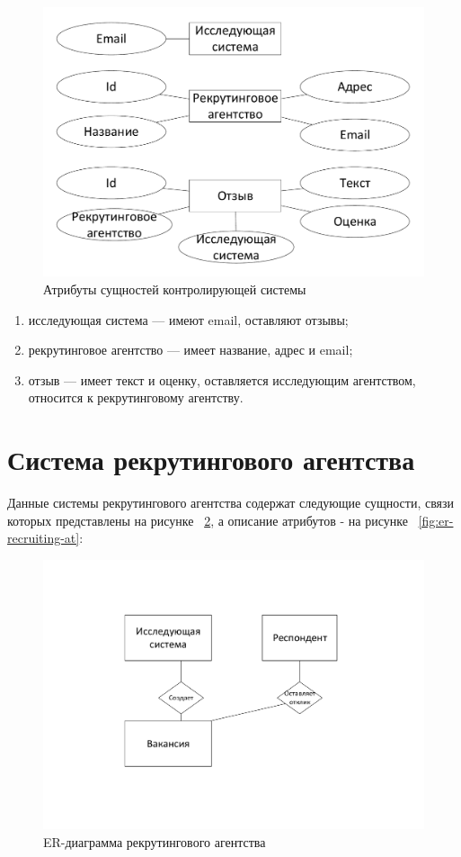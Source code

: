 \begin{figure}[ht]
  \centering
  \includegraphics[width=\textwidth]{include/er-supervising-at.pdf}
\caption{Атрибуты сущностей контролирующей системы}
\label{fig:er-supervising-at}
\end{figure}

\begin{enumerate}
\item исследующая система — имеют email, оставляют отзывы;
\item рекрутинговое агентство — имеет название, адрес и email;
\item отзыв — имеет текст и оценку, оставляется исследующим агентством, относится к рекрутинговому агентству.
\end{enumerate}

\section{Система рекрутингового агентства}
Данные системы рекрутингового агентства содержат следующие сущности, связи которых представлены на рисунке ~\ref{fig:er-recruiting}, а описание атрибутов - на рисунке ~\ref{fig:er-recruiting-at}:

\begin{figure}[ht]
  \centering
  \includegraphics[width=\textwidth]{include/er-recruiting.pdf}
\caption{ER-диаграмма рекрутингового агентства}
\label{fig:er-recruiting}
\end{figure}

